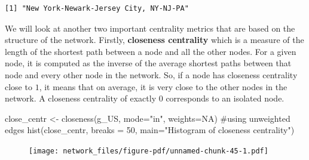 \documentclass[
  letterpaper,
  DIV=11,
  numbers=noendperiod]{scrreprt}
\newenvironment{Shaded}{\begin{snugshade}}{\end{snugshade}}
\newcommand{\AttributeTok}[1]{\textcolor[rgb]{0.40,0.45,0.13}{#1}}
\newcommand{\CommentTok}[1]{\textcolor[rgb]{0.37,0.37,0.37}{#1}}
\newcommand{\ConstantTok}[1]{\textcolor[rgb]{0.56,0.35,0.01}{#1}}
\newcommand{\DecValTok}[1]{\textcolor[rgb]{0.68,0.00,0.00}{#1}}
\newcommand{\FunctionTok}[1]{\textcolor[rgb]{0.28,0.35,0.67}{#1}}
\newcommand{\NormalTok}[1]{\textcolor[rgb]{0.00,0.23,0.31}{#1}}
\newcommand{\OtherTok}[1]{\textcolor[rgb]{0.00,0.23,0.31}{#1}}
\newcommand{\SpecialCharTok}[1]{\textcolor[rgb]{0.37,0.37,0.37}{#1}}
\newcommand{\StringTok}[1]{\textcolor[rgb]{0.13,0.47,0.30}{#1}}
\begin{document}
\begin{Shaded}
\end{Shaded}

\begin{verbatim}
[1] "New York-Newark-Jersey City, NY-NJ-PA"
\end{verbatim}

We will look at another two important centrality metrics that are based
on the structure of the network. Firstly, \textbf{closeness centrality}
which is a measure of the length of the shortest path between a node and
all the other nodes. For a given node, it is computed as the inverse of
the average shortest paths between that node and every other node in the
network. So, if a node has closeness centrality close to \(1\), it means
that on average, it is very close to the other nodes in the network. A
closeness centrality of exactly \(0\) corresponds to an isolated node.

\begin{Shaded}
\begin{Highlighting}[]
\NormalTok{close\_centr }\OtherTok{\textless{}{-}} \FunctionTok{closeness}\NormalTok{(g\_US, }\AttributeTok{mode=}\StringTok{"in"}\NormalTok{, }\AttributeTok{weights=}\ConstantTok{NA}\NormalTok{) }\CommentTok{\#using unweighted edges}
\FunctionTok{hist}\NormalTok{(close\_centr, }\AttributeTok{breaks =} \DecValTok{50}\NormalTok{, }\AttributeTok{main=}\StringTok{"Histogram of closeness centrality"}\NormalTok{)}
\end{Highlighting}
\end{Shaded}

\begin{figure}[H]

{\centering \texttt{[image: network\_files/figure-pdf/unnamed-chunk-45-1.pdf]}

}

\end{figure}
\end{document}
